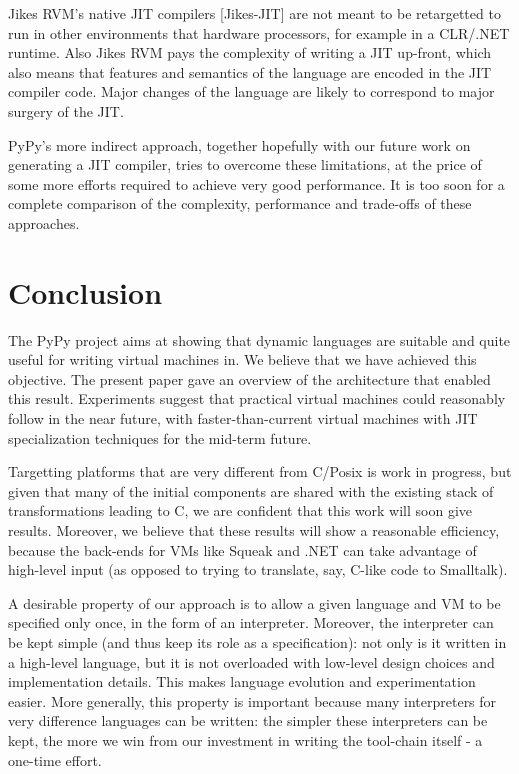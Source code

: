 \documentclass{acm_proc_article-sp}
\begin{document}
Jikes RVM's native JIT compilers [Jikes-JIT]
are not meant to be retargetted to run in other environments
that hardware processors, for example in a CLR/.NET
runtime. Also Jikes RVM pays the complexity of writing
a JIT up-front, which also means that features and semantics of the
language are encoded in the JIT compiler code.  Major changes of the
language are likely to correspond to major surgery of the JIT.

PyPy's more indirect approach, together hopefully with our future work
on generating a JIT compiler, tries to overcome these limitations, at
the price of some more efforts required to achieve very good
performance. It is too soon for a complete comparison of the complexity,
performance and trade-offs of these approaches.



\section{Conclusion}
\label{conclusion}


The PyPy project aims at showing that dynamic languages are suitable and
quite useful for writing virtual machines in.  We believe that we have
achieved this objective.  The present paper gave an overview of the
architecture that enabled this result.  Experiments suggest that
practical virtual machines could reasonably follow in the near future,
with faster-than-current virtual machines with JIT specialization
techniques for the mid-term future.

Targetting platforms that are very different from C/Posix is work in
progress, but given that many of the initial components are shared with
the existing stack of transformations leading to C, we are confident
that this work will soon give results.  Moreover, we believe that these
results will show a reasonable efficiency, because the back-ends for VMs
like Squeak and .NET can take advantage of high-level input (as opposed
to trying to translate, say, C-like code to Smalltalk).

A desirable property of our approach is to allow a given language and VM
to be specified only once, in the form of an interpreter.  Moreover, the
interpreter can be kept simple (and thus keep its role as a
specification): not only is it written in a high-level language, but it
is not overloaded with low-level design choices and implementation
details.  This makes language evolution and experimentation easier.
More generally, this property is important because many interpreters for
very difference languages can be written: the simpler these interpreters
can be kept, the more we win from our investment in writing the
tool-chain itself - a one-time effort.
\end{document}
